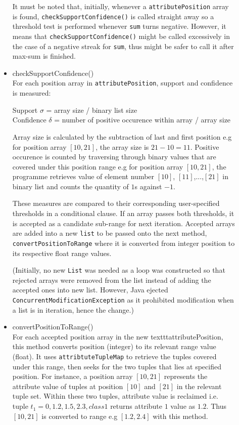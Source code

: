 \begin{description}
\begin{itemize}
	It must be noted that, initially, whenever a \texttt{attributePosition} array is found, \texttt{checkSupportConfidence()} is called straight away so a threshold test is performed whenever \texttt{sum} turns negative. However, it means that \texttt{checkSupportConfidence()} might be called excessively in the case of a negative streak for \texttt{sum}, thus might be safer to call it after max-sum is finished. 
	
	\item{checkSupportConfidence()} \\
	 For each position array in \texttt{attributePosition}, support and confidence is measured:
	  
	 Support $\sigma$ = array size / binary list size \\
	 Confidence $\delta$ = number of positive occurence within array / array size
	 
	 Array size is calculated by the subtraction of last and first position e.g for position array $[10,21]$, the array size is $21 - 10 = 11$. Positive occurence is counted by traversing through binary values that are covered under this position range e.g for position array $[10,21]$, the programme retrieves value of element number $[10]$, $[11]$,...,$[21]$ in binary list and counts the quantity of $1$s against $-1$. 
	 
	 These measures are compared to their corresponding user-specified thresholds in a conditional clause. If an array passes both thresholds, it is accepted as a candidate sub-range for next iteration. Accepted arrays are added into a new \texttt{list} to be passed onto the next method, \texttt{convertPositionToRange} where it is converted from integer position to its respective float range values.
	 
	 (Initially, no new \texttt{List} was needed as a loop was constructed so that rejected arrays were removed from the list instead of adding the accepted ones into new list. However, Java ejected \texttt{ConcurrentModificationException} as it prohibited modification when a list is in iteration, hence the change.)
	
	\item{convertPositionToRange()} \\
	For each accepted position array in the new  texttt{attributePosition}, this method converts position (integer) to its relevant range value (float). It uses \texttt{attribtuteTupleMap} to retrieve the tuples covered under this range, then seeks for the two tuples that lies at specified position. For instance, a position array $[10,21]$ represents the attribute value of tuples at position $[10]$ and $[21]$ in the relevant tuple set. Within these two tuples, attribute value is reclaimed i.e. tuple $t_1 = {0, 1.2, 1.5, 2.3, class1}$ returns attribute $1$ value as $1.2$. Thus $[10,21]$ is converted to range e.g $[1.2, 2.4]$ with this method.
	

\end{itemize}
\end{description}
